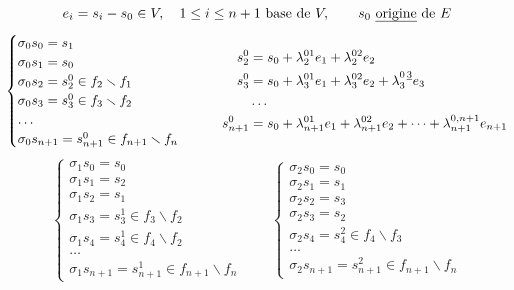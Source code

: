 \documentclass[11pt,a4paper]{article}
\begin{document}
\[
e_i = s_i - s_0 \in V, \quad 1\leq i\leq n+1 \ \text{base de } V, \qquad s_0 \ \text{\emph{origine} de } E
\]
\[
\begin{cases}
\sigma_0 s_0 = s_1 \\
\sigma_0 s_1 = s_0 \\
\sigma_0 s_2 = s_2^0 \in f_2\smallsetminus f_1 \\
\sigma_0 s_3 = s_3^0 \in f_3\smallsetminus f_2 \\
\dots \\
\sigma_0 s_{n+1} = s_{n+1}^0 \in f_{n+1}\smallsetminus f_n
\end{cases}
\qquad
\begin{aligned}
s_2^0 &= s_0+\lambda_2^{01}e_1+\lambda_2^{02}e_2 \\
s_3^0 &= s_0+\lambda_3^{01}e_1+\lambda_3^{02}e_2+\lambda_3^{0\,\uncertain{3}}e_3 \\
&\dots \\
s_{n+1}^0 &= s_0+\lambda_{n+1}^{01}e_1+\lambda_{n+1}^{02}e_2+\dots+\lambda_{n+1}^{0,n+1}e_{n+1}
\end{aligned}
\]
\[
\begin{cases}
\sigma_1 s_0 = s_0 \\
\sigma_1 s_1 = s_2 \\
\sigma_1 s_2 = s_1 \\
\sigma_1 s_3 = s_3^1 \in f_3\smallsetminus f_2 \\
\sigma_1 s_4 = s_4^1 \in f_4\smallsetminus f_2 \\
\dots \\
\sigma_1 s_{n+1} = s_{n+1}^1 \in f_{n+1}\smallsetminus f_n
\end{cases}
\qquad
\begin{cases}
\sigma_2 s_0 = s_0 \\
\sigma_2 s_1 = s_1 \\
\sigma_2 s_2 = s_3 \\
\sigma_2 s_3 = s_2 \\
\sigma_2 s_4 = s_4^2 \in f_4\smallsetminus f_3 \\
\dots \\
\sigma_2 s_{n+1} = s_{n+1}^2 \in f_{n+1}\smallsetminus f_n
\end{cases}
\]
\end{document}
